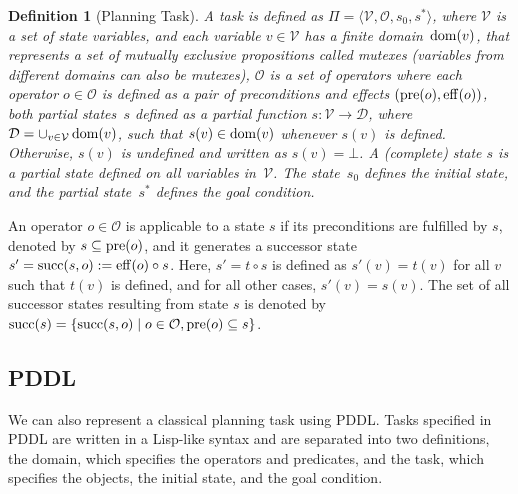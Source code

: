 \documentclass[ppgc,diss,english]{iiufrgs}
\newtheorem{definition}{Definition}
\begin{document}
\begin{definition}[\sas Planning Task]\label{def:sas}
A \sas task is defined as $\Pi=\langle\mathcal{V},\mathcal{O},s_0,s^*\rangle$, where $\mathcal{V}$ is a set of state variables, and each variable $v\in \mathcal{V}$ has a finite domain~$\operatorname{dom}(v)$, that represents a set of mutually exclusive propositions called mutexes (variables from different domains can also be mutexes), $\mathcal{O}$ is a set of operators where each operator $o \in \mathcal{O}$ is defined as a pair of preconditions and effects $(\operatorname{pre}(o),\operatorname{eff}(o))$, both partial states~$s$ defined as a partial function $s:\mathcal{V}\rightarrow \mathcal{D}$, where $\mathcal{D}=\cup_{v\in \mathcal{V}}\operatorname{dom}(v)$, such that $s(v)\in \operatorname{dom}(v)$ whenever $s(v)$ is defined. Otherwise, $s(v)$ is undefined and written as $s(v)=\bot$.  A (complete) state $s$ is a partial state defined on all variables in~$\mathcal{V}$. The state~$s_0$ defines the initial state, and the partial state~$s^*$ defines the goal condition. %
\end{definition}

An operator $o \in \mathcal{O}$ is applicable to a state $s$ if its preconditions are fulfilled by $s$, denoted by $s \subseteq \operatorname{pre}(o)$, and it generates a successor state $s'=\operatorname{succ}(s,o):=\operatorname{eff}(o)\circ s$. Here, $s'=t\circ s$ is defined as $s'(v)=t(v)$ for all $v$ such that $t(v)$ is defined, and for all other cases, $s'(v)=s(v)$. The set of all successor states resulting from state $s$ is denoted by $\operatorname{succ}(s)=\{{\operatorname{succ}(s,o)\mid o\in \mathcal{O}, \operatorname{pre}(o) \subseteq s}\}$.%

\subsection{PDDL}
\label{sec:background-pddl}
We can also represent a classical planning task using PDDL. Tasks specified in PDDL are written in a Lisp-like syntax and are separated into two definitions, the domain, which specifies the operators and predicates, and the task, which specifies the objects, the initial state, and the goal condition.
\end{document}
